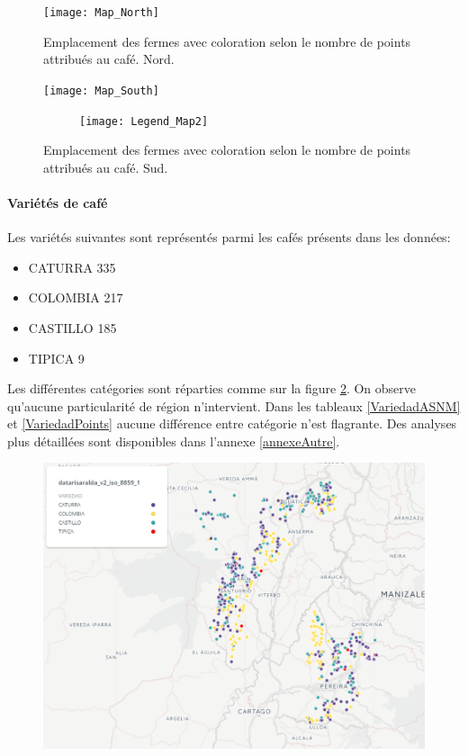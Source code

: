 \begin{figure}[H]
	\texttt{[image: Map\_North]}
	\caption{Emplacement des fermes avec coloration selon le nombre de points attribués au café. Nord.}
\end{figure}

\begin{figure}[H]
	\texttt{[image: Map\_South]}
	
	\begin{figure}[H]
		\texttt{[image: Legend\_Map2]}
	\end{figure}
	\caption{\label{FincaVSPoints} Emplacement des fermes avec coloration selon le nombre de points attribués au café. Sud.}
\end{figure}

\paragraph{Variétés de café} Les variétés suivantes sont représentés parmi les cafés présents dans les données: 
\begin{itemize}
	\item CATURRA     335
	\item COLOMBIA    217
	\item CASTILLO    185
	\item TIPICA        9
\end{itemize}

\noindent Les différentes catégories sont réparties comme sur la figure \ref{fig:variedadmap}. On observe qu'aucune particularité de région n'intervient. Dans les tableaux \ref{VariedadASNM} et \ref{VariedadPoints} aucune différence entre catégorie n'est flagrante. Des analyses plus détaillées sont disponibles dans l'annexe \ref{annexeAutre}.

\begin{figure}
	\centering
	\includegraphics[width=0.7\linewidth]{img/Exploration/VariedadMap}
	\caption{}
	\label{fig:variedadmap}
\end{figure}


